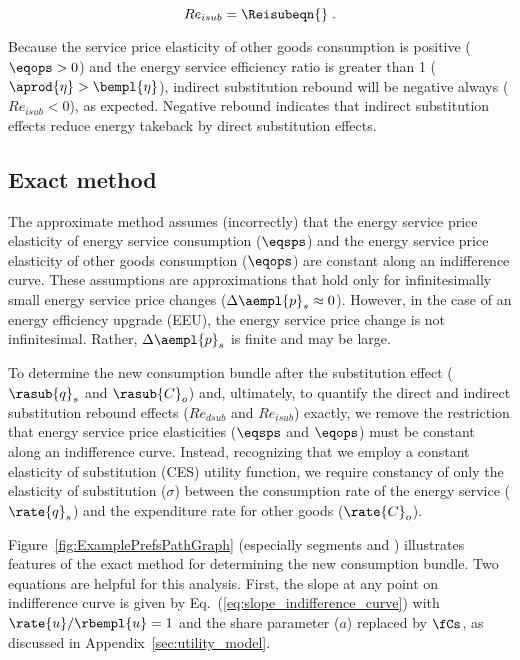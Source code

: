 \begin{equation}
  Re_{isub} = \Reisubeqn{} \; .
\end{equation}

Because the service price elasticity of other goods consumption is positive ($\eqops > 0$) and
the energy service efficiency ratio is greater than 1 ($\aprod{\eta} > \bempl{\eta}$),
indirect substitution rebound will be negative always ($Re_{isub} < 0$),
as expected.
Negative rebound indicates that indirect substitution effects 
reduce energy takeback by direct substitution effects.


\subsection{Exact method}
\label{sec:Resub_exact_method}

The approximate method assumes (incorrectly) that 
the energy service price elasticity of energy service consumption ($\eqsps$) and
the energy service price elasticity of other goods consumption ($\eqops$)
are constant along an indifference curve.
These assumptions are approximations that hold only 
for infinitesimally small energy service price changes 
($\Delta \aempl{p}_s \approx 0$).
However, in the case of an energy efficiency upgrade (EEU), 
the energy service price change is not infinitesimal.
Rather, 
$\Delta \aempl{p}_s$ is finite and may be large.

To determine the new consumption bundle after the substitution effect 
($\rasub{q}_s$ and $\rasub{C}_o$)
and,
ultimately, to quantify the direct and indirect substitution rebound effects
($Re_{dsub}$ and $Re_{isub}$) exactly,
we remove the restriction that energy service price elasticities ($\eqsps$ and $\eqops$)
must be constant along an indifference curve.
Instead, recognizing that we employ a constant elasticity of substitution (CES)
utility function,
we require constancy of only
the elasticity of substitution ($\sigma$) between
the consumption rate of the energy service ($\rate{q}_s$)
and the expenditure rate for other goods ($\rate{C}_o$).

Figure~\ref{fig:ExamplePrefsPathGraph} 
(especially segments \starc{} and \chat{})
illustrates features
of the exact method for determining the new consumption bundle.
Two equations are helpful for this analysis.
First, the slope at any point on indifference curve \iicirc{} 
is given by Eq.~(\ref{eq:slope_indifference_curve}) with 
$\rate{u}/\rbempl{u} = 1$ and 
the share parameter ($a$) replaced by $\fCs$,
as discussed in Appendix~\ref{sec:utility_model}.

